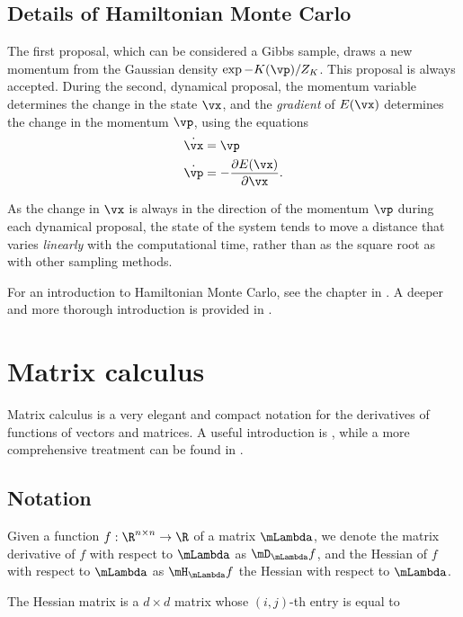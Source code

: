 \subsection{Details of Hamiltonian Monte Carlo}

The first proposal, which can be considered a Gibbs sample, draws a new momentum from the Gaussian density
$\exp{-K(\vp)}/Z_K$. This proposal is always accepted. During the second, dynamical proposal, the momentum
variable determines the change in the state $\vx$, and the \emph{gradient} of $E(\vx)$ determines the change
in the momentum $\vp$, using the equations
\begin{align*}
	\dot{\vx} & = \vp                                    \\
	\dot{\vp} & = -\frac{\partial E(\vx)}{\partial \vx}. 
\end{align*}

As the change in $\vx$ is always in the direction of the momentum $\vp$ during each dynamical proposal, the
state of the system tends to move a distance that varies \emph{linearly} with the computational time, rather
than as the square root as with other sampling methods.

For an introduction to Hamiltonian Monte Carlo, see the chapter in \cite{MacKay:2002:ITI:971143}. A deeper
and more thorough introduction is provided in \cite{Betancourt2017}.

\section{Matrix calculus}

Matrix calculus is a very elegant and compact notation for the derivatives of functions of vectors and matrices.
A useful introduction is \cite{Wand2002}, while a more comprehensive treatment can be found in
\cite{magnus99}.

\subsection{Notation}

Given a function $f:\R^{n \times n} \to \R$ of a matrix $\mLambda$, we denote the matrix derivative of $f$ with 
respect to $\mLambda$ as $\mD_\mLambda f$, and the Hessian of $f$ with respect to $\mLambda$ as
$\mH_\mLambda f$ the Hessian with respect to $\mLambda$.

The Hessian matrix is a $d \times d$ matrix whose $(i, j)$-th entry is equal to

